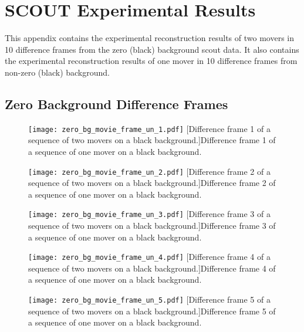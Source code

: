 \chapter{SCOUT Experimental Results}\label{app:scoutExpResults}

This appendix contains the experimental reconstruction results of two movers in 10 difference frames from the zero (black) background \gls{scout} data. It also contains the experimental reconstruction results of one mover in 10 difference frames from non-zero (black) background.


\section{Zero Background Difference Frames}

\begin{figure}[!ht]
	\centering
	\texttt{[image: zero\_bg\_movie\_frame\_un\_1.pdf]}
	[Difference frame 1 of a sequence of two movers on a black background.]{Difference frame 1 of a sequence of one mover on a black background.}
	\label{fig:zero_bg_movie_frame_un_1}
\end{figure}

\begin{figure}[!ht]
	\centering
	\texttt{[image: zero\_bg\_movie\_frame\_un\_2.pdf]}
	[Difference frame 2 of a sequence of two movers on a black background.]{Difference frame 2 of a sequence of one mover on a black background.}
	\label{fig:zero_bg_movie_frame_un_2}
\end{figure}

\clearpage

\begin{figure}[!ht]
	\centering
	\texttt{[image: zero\_bg\_movie\_frame\_un\_3.pdf]}
	[Difference frame 3 of a sequence of two movers on a black background.]{Difference frame 3 of a sequence of one mover on a black background.}
	\label{fig:zero_bg_movie_frame_un_3}
\end{figure}

\begin{figure}[!ht]
	\centering
	\texttt{[image: zero\_bg\_movie\_frame\_un\_4.pdf]}
	[Difference frame 4 of a sequence of two movers on a black background.]{Difference frame 4 of a sequence of one mover on a black background.}
	\label{fig:zero_bg_movie_frame_un_4}
\end{figure}

\begin{figure}[!ht]
	\centering
	\texttt{[image: zero\_bg\_movie\_frame\_un\_5.pdf]}
	[Difference frame 5 of a sequence of two movers on a black background.]{Difference frame 5 of a sequence of one mover on a black background.}
	\label{fig:zero_bg_movie_frame_un_5}
\end{figure}

